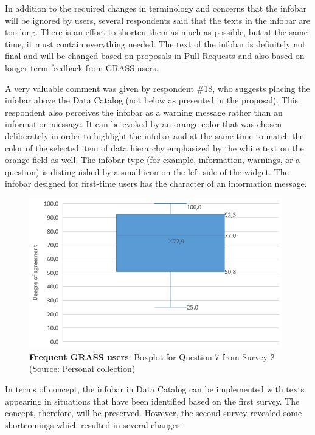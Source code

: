 \documentclass[a4paper,10pt,twoside]{article}
\begin{document}
\noindent In addition to the required changes in terminology and
concerns that the infobar will be ignored by users, several
respondents said that the texts in the infobar are too long. There is
an effort to shorten them as much as possible, but at the same time,
it must contain everything needed. The text of the infobar is
definitely not final and will be changed based on proposals in Pull
Requests and also based on longer-term feedback from GRASS users.

A very valuable comment was given by respondent \#18, who suggests
placing the infobar above the Data Catalog (not below as presented in
the proposal). This respondent also perceives the infobar as a
warning message rather than an information message. It can be evoked
by an orange color that was chosen deliberately in order to highlight
the infobar and at the same time to match the color of the selected
item of data hierarchy emphasized by the white text on the orange
field as well. The infobar type (for example, information, warnings,
or a question) is distinguished by a small icon on the left side of
the widget. The infobar designed for first-time users has the
character of an information message.

\vspace{0.3cm}
\begin{figure}[hbt!] 
\begin{center}
\includegraphics[width=11cm]{../surveys/analyzed_data/survey2_question7_boxplot_group2.png} 
\caption[\textbf{Frequent GRASS users}: Boxplot for Question 7 from Survey 2]{\textbf{Frequent GRASS users}: Boxplot for Question 7 from Survey 2 (Source: Personal collection)}
\label{fig:survey2_question7_boxplot_group2}
\end{center}
\end{figure}

\noindent In terms of concept, the infobar in Data Catalog can be
implemented with texts appearing in situations that have been
identified based on the first survey. The concept, therefore, will be
preserved. However, the second survey revealed some shortcomings which
resulted in several changes:
\end{document}
